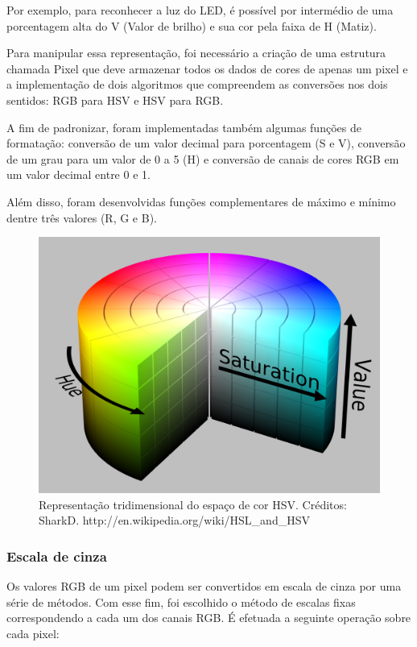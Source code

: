 \documentclass[12pt]{article}
\begin{document}
Por exemplo, para reconhecer a luz do LED, \'e poss\'ivel por interm\'edio de uma porcentagem alta
do V (Valor de brilho) e sua cor pela faixa de H (Matiz).

Para manipular essa representa\c c\~ao, foi necess\'ario a cria\c c\~ao de uma estrutura chamada Pixel
que deve armazenar todos os dados de cores de apenas um pixel e a implementa\c c\~ao de dois algoritmos
que compreendem as convers\~oes nos dois sentidos: RGB para HSV e HSV para RGB.

A fim de padronizar, foram implementadas tamb\'em algumas fun\c c\~oes de formata\c c\~ao: convers\~ao de
um valor decimal para porcentagem (S e V), convers\~ao de um grau para um valor de 0 a 5 (H) e convers\~ao
de canais de cores RGB em um valor decimal entre 0 e 1.

Al\'em disso, foram desenvolvidas fun\c c\~oes complementares de m\'aximo e m\'inimo dentre tr\^es valores (R, G e B).

	\begin{figure}[ht!]
	\begin{center}
		\includegraphics[scale=0.15]{img/HSV_color_solid_cylinder_alpha_lowgamma.png}
		\footnotesize \caption{Representa\c c\~ao tridimensional do espa\c co de cor HSV. Cr\'editos: SharkD. http://en.wikipedia.org/wiki/HSL\_and\_HSV }
	\end{center}
	\end{figure}	

\subsubsection{Escala de cinza}
Os valores RGB de um pixel podem ser convertidos em escala de cinza por uma s\'erie de m\'etodos.
Com esse fim, foi escolhido o m\'etodo de escalas fixas correspondendo a cada um dos canais RGB.
\'E efetuada a seguinte opera\c c\~ao sobre cada pixel:
\end{document}
